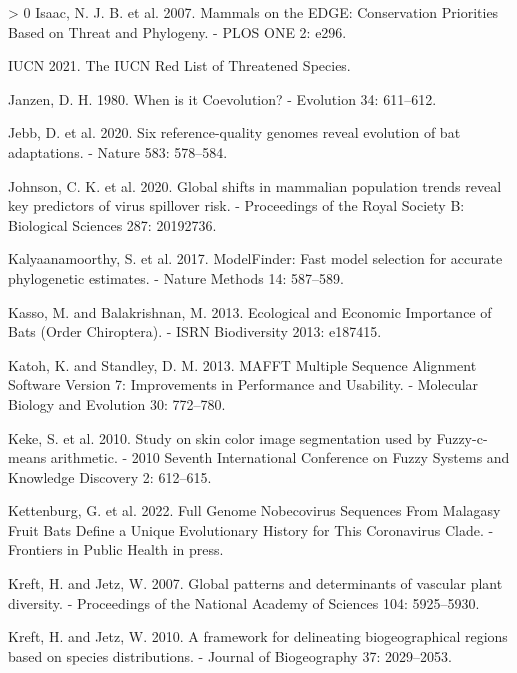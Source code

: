 \documentclass[11pt]{article}
\newlength{\cslhangindent}
\newenvironment{CSLReferences}[3] %
 {%
  \setlength{\parindent}{0pt}
  \ifodd #1 \everypar{\setlength{\hangindent}{\cslhangindent}}\ignorespaces\fi
  \ifnum #2 > 0
  \setlength{\parskip}{#2\baselineskip}
  \fi
 }%
 {}
\begin{document}
\begin{CSLReferences}{1}{0}
\leavevmode\hypertarget{ref-Isaac2007MamEdg}{}%
Isaac, N. J. B. et al. 2007. Mammals on the EDGE: Conservation
Priorities Based on Threat and Phylogeny. - PLOS ONE 2: e296.

\leavevmode\hypertarget{ref-IUCN2021IucRed}{}%
IUCN 2021. The IUCN Red List of Threatened Species.

\leavevmode\hypertarget{ref-Janzen1980WheIt}{}%
Janzen, D. H. 1980. When is it Coevolution? - Evolution 34: 611--612.

\leavevmode\hypertarget{ref-Jebb2020SixRef}{}%
Jebb, D. et al. 2020. Six reference-quality genomes reveal evolution of
bat adaptations. - Nature 583: 578--584.

\leavevmode\hypertarget{ref-Johnson2020GloShi}{}%
Johnson, C. K. et al. 2020. Global shifts in mammalian population trends
reveal key predictors of virus spillover risk. - Proceedings of the
Royal Society B: Biological Sciences 287: 20192736.

\leavevmode\hypertarget{ref-Kalyaanamoorthy2017ModFas}{}%
Kalyaanamoorthy, S. et al. 2017. ModelFinder: Fast model selection for
accurate phylogenetic estimates. - Nature Methods 14: 587--589.

\leavevmode\hypertarget{ref-Kasso2013EcoEco}{}%
Kasso, M. and Balakrishnan, M. 2013. Ecological and Economic Importance
of Bats (Order Chiroptera). - ISRN Biodiversity 2013: e187415.

\leavevmode\hypertarget{ref-Katoh2013MafMul}{}%
Katoh, K. and Standley, D. M. 2013. MAFFT Multiple Sequence Alignment
Software Version 7: Improvements in Performance and Usability. -
Molecular Biology and Evolution 30: 772--780.

\leavevmode\hypertarget{ref-Keke2010StuSki}{}%
Keke, S. et al. 2010. Study on skin color image segmentation used by
Fuzzy-c-means arithmetic. - 2010 Seventh International Conference on
Fuzzy Systems and Knowledge Discovery 2: 612--615.

\leavevmode\hypertarget{ref-Kettenburg2022FulGen}{}%
Kettenburg, G. et al. 2022. Full Genome Nobecovirus Sequences From
Malagasy Fruit Bats Define a Unique Evolutionary History for This
Coronavirus Clade. - Frontiers in Public Health in press.

\leavevmode\hypertarget{ref-Kreft2007GloPat}{}%
Kreft, H. and Jetz, W. 2007. Global patterns and determinants of
vascular plant diversity. - Proceedings of the National Academy of
Sciences 104: 5925--5930.

\leavevmode\hypertarget{ref-Kreft2010FraDel}{}%
Kreft, H. and Jetz, W. 2010. A framework for delineating biogeographical
regions based on species distributions. - Journal of Biogeography 37:
2029--2053.


\end{CSLReferences}
\end{document}

